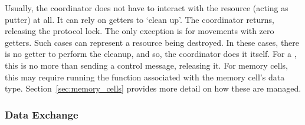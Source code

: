 \begin{enumerate}
	 Usually, the coordinator does not have to interact with the resource (acting as putter) at all. It can rely on getters to `clean up'. The coordinator returns, releasing the protocol lock. The only exception is for movements with zero getters. Such cases can represent a resource being destroyed. In these cases, there is no getter to perform the cleanup, and so, the coordinator does it itself. For a , this is no more than sending a control message, releasing it. For memory cells, this may require running the  function associated with the memory cell's data type.  Section~\ref{sec:memory_cells} provides more detail on how these are managed.
	 	
\end{enumerate}

\subsubsection{Data Exchange}
\label{sec:data_exchange}

